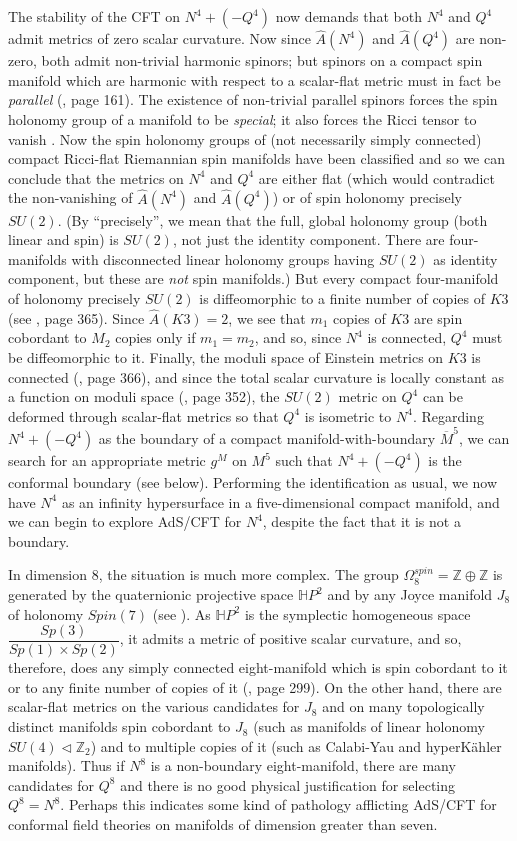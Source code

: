 \documentclass[a4paper,12pt]{article}
\newcommand{\field}[1]{\mathbb{#1}}
\newcommand{\h}{\field{H}}
\newcommand{\Z}{\field{Z}}
\theoremstyle{definition}
\renewcommand{\u}{\textit}
\renewcommand{\-}{$\dfrac{\quad\enspace}{\quad}$}
\begin{document}
The stability of the CFT on $N^4+(-Q^4)$ now demands that both $N^4$ and $Q^4$ admit metrics of zero scalar curvature. Now since $\hat{A}(N^4)$ and $\hat{A}(Q^4)$ are non-zero, both admit non-trivial harmonic spinors; but spinors on a compact spin manifold which are harmonic with respect to a scalar-flat metric must in fact be \u{parallel} (\cite{12}, page 161). The existence of non-trivial parallel spinors forces the spin holonomy group of a manifold to be \u{special}; it also forces the Ricci tensor to vanish \cite{18}. Now the spin holonomy groups of (not necessarily simply connected) compact Ricci-flat Riemannian spin manifolds have been classified \cite{19} and so we can conclude that the metrics on $N^4$ and $Q^4$ are either flat (which would contradict the non-vanishing of $\hat{A}(N^4)$ and $\hat{A}(Q^4)$) or of spin holonomy precisely $SU(2)$. (By ``precisely'', we mean that the full, global holonomy group (both linear and spin) is $SU(2)$, not just the identity component. There are four-manifolds with disconnected linear holonomy groups having $SU(2)$ as identity component, but these are \u{not} spin manifolds.) But every compact four-manifold of holonomy precisely $SU(2)$ is diffeomorphic to a finite number of copies of $K3$ (see \cite{8}, page 365). Since $\hat{A}(K3)=2$, we see that $m_1$ copies of $K3$ are spin cobordant to $M_2$ copies only if $m_1=m_2$, and so, since $N^4$ is connected, $Q^4$ must be diffeomorphic to it. Finally, the moduli space of Einstein metrics on $K3$ is connected (\cite{8}, page 366), and since the total scalar curvature is locally constant as a function on moduli space (\cite{8}, page 352), the $SU(2)$ metric on $Q^4$ can be deformed through scalar-flat metrics so that $Q^4$ is isometric to $N^4$. Regarding $N^4+(-Q^4)$ as the boundary of a compact manifold-with-boundary $\overline{M}^5$, we can search for an appropriate metric $g^M$ on $M^5$ such that $N^4+(-Q^4)$ is the conformal boundary (see below). Performing the identification as usual, we now have $N^4$ as an infinity hypersurface in a five-dimensional compact manifold, and we can begin to explore AdS/CFT for $N^4$, despite the fact that it is not a boundary.

In dimension 8, the situation is much more complex. The group $\Omega^{spin}_8=\Z\oplus \Z$ is generated by the quaternionic projective space $\h P^2$ and by any Joyce manifold $J_8$ of holonomy $Spin(7)$ (see \cite{20}). As $\h P^2$ is the symplectic homogeneous space $\dfrac{Sp(3)}{Sp(1)\times Sp(2)}$, it admits a metric of positive scalar curvature, and so, therefore, does any simply connected eight-manifold which is spin cobordant to it or to any finite number of copies of it (\cite{12}, page 299). On the other hand, there are scalar-flat metrics on the various candidates for $J_8$ and on many topologically distinct manifolds spin cobordant to $J_8$ (such as manifolds of linear holonomy $SU(4)\triangleleft\Z_2$) and to multiple copies of it (such as Calabi-Yau and hyperK\"{a}hler manifolds). Thus if $N^8$ is a non-boundary eight-manifold, there are many candidates for $Q^8$ and there is no good physical justification for selecting $Q^8=N^8$. Perhaps this indicates some kind of pathology afflicting AdS/CFT for conformal field theories on manifolds of dimension greater than seven.
\end{document}
